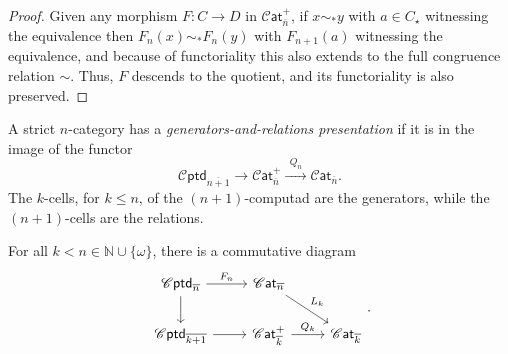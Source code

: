 \documentclass[12pt,a4paper]{article}
\numberwithin{equation}{section}
\newcommand{\cat}[1]{\mathscr{C} \mathsf{at}_{\overline{#1}}}
\newcommand{\cptd}[1]{\mathscr{C} \mathsf{ptd}_{\overline{#1}}}
\begin{document}
\begin{proof}
    Given any morphism $F: C \to D$ in $\cat{n}^+$, if $x \sim_* y$ with $a \in C_\star$ witnessing the equivalence then $F_n(x) \sim_* F_n(y)$ with $F_{n+1}(a)$ witnessing the equivalence, and because of functoriality this also extends to the full congruence relation $\sim$. Thus, $F$ descends to the quotient, and its functoriality is also preserved.
\end{proof}

\begin{definition}\label{def:gen_and_rel_presentation}
    A strict $n$-category has a \emph{generators-and-relations presentation} if it is in the image of the functor
    \begin{equation}
        \cptd{n+1} \xrightarrow{\quad} \cat{n}^+ \xrightarrow{\ \ Q_n \ \ } \cat{n}.
    \end{equation}
    The $k$-cells, for $k \leq n$, of the $(n+1)$-computad are the generators, while the $(n+1)$-cells are the relations.
\end{definition}


\begin{proposition}\label{prop:localization_is_presentation}
    For all $k < n \in \mathbb{N} \cup \{\omega\}$, there is a commutative diagram 
    \begin{equation}
        \begin{tikzcd}
            \cptd{n} \arrow[r, "F_{n}"] \arrow[d] & \cat{n} \arrow[rd, "L_k"] \\
            \cptd{k+1} \arrow[r] & \cat{k}^+ \arrow[r, "Q_k"] & \cat{k}
        \end{tikzcd}.
    \end{equation}
\end{proposition}
\end{document}
